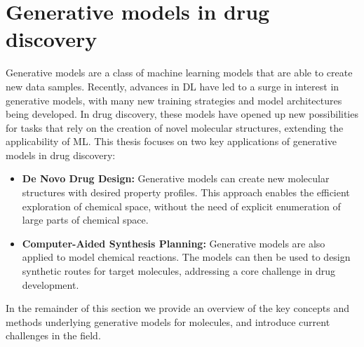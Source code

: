 \section{Generative models in drug discovery}
Generative models are a class of machine learning models that are able to create new data samples.
Recently, advances in \ac{DL} have led to a surge in interest in generative models, with many new
training strategies and model architectures being developed. In drug discovery, these models have
opened up new possibilities for tasks that rely on the creation of novel molecular structures,
extending the applicability of \ac{ML}. This thesis focuses on two key applications of generative
models in drug discovery:
\begin{itemize}
      \item \textbf{De Novo Drug Design:} Generative models can create new molecular structures with desired property
            profiles. This approach enables the efficient exploration of chemical space, without the need of
            explicit enumeration of large parts of chemical space.
      \item \textbf{Computer-Aided Synthesis Planning:} Generative models are also applied to model
            chemical reactions. The models can then be used to design synthetic routes for target
            molecules, addressing a core challenge in drug development.
\end{itemize}

In the remainder of this section we provide an overview of the key concepts and methods underlying
generative models for molecules, and introduce current challenges in the field.

